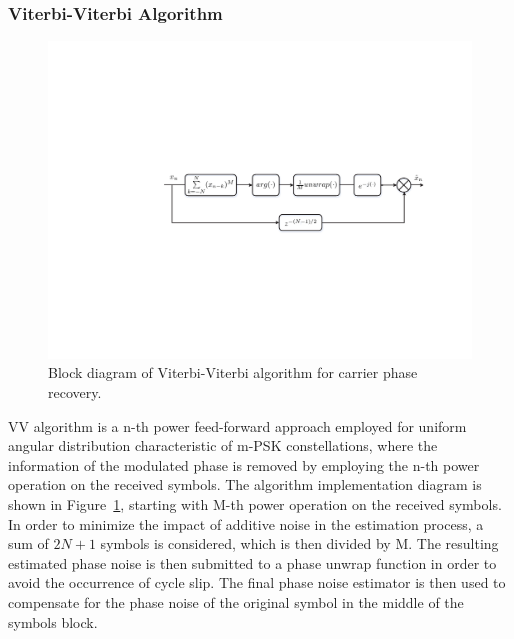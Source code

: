 \begin{refsection}
\subsubsection{Viterbi-Viterbi Algorithm}
\begin{figure}[h!]
    \centering
    \includegraphics[width=\textwidth]{./sdf/dsp_laser_phase_compensation/figures/VV_phaseEstimation.pdf}
    \caption{Block diagram of Viterbi-Viterbi algorithm for carrier phase recovery.}
    \label{fig_VVdiagram}
\end{figure}
VV algorithm is a n-th power feed-forward approach employed for uniform angular distribution characteristic of m-PSK constellations, where the information of the modulated phase is removed by employing the n-th power operation on the received symbols. The algorithm implementation diagram is shown in Figure~\ref{fig_VVdiagram}, starting with M-th power operation on the received symbols. In order to minimize the impact of additive noise in the estimation process, a sum of $2N+1$ symbols is considered, which is then divided by M. The resulting estimated phase noise is then submitted to a phase unwrap function in order to avoid the occurrence of cycle slip. The final phase noise estimator is then used to compensate for the phase noise of the original symbol in the middle of the symbols block.



\end{refsection}
